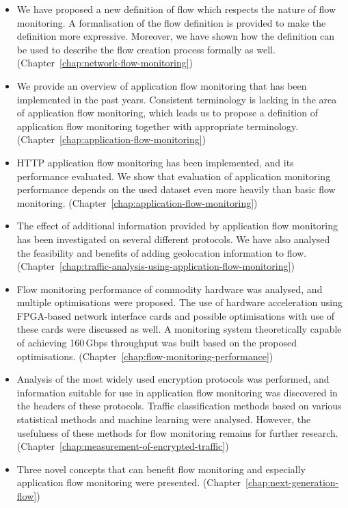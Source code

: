\begin{itemize}
    \item We have proposed a new definition of flow which respects the nature of flow monitoring. A formalisation of the flow definition is provided to make the definition more expressive. Moreover, we have shown how the definition can be used to describe the flow creation process formally as well. (Chapter~\ref{chap:network-flow-monitoring})
    \item We provide an overview of application flow monitoring that has been implemented in the past years. Consistent terminology is lacking in the area of application flow monitoring, which leads us to propose a definition of application flow monitoring together with appropriate terminology. (Chapter~\ref{chap:application-flow-monitoring})
    \item HTTP application flow monitoring has been implemented, and its performance evaluated. We show that evaluation of application monitoring performance depends on the used dataset even more heavily than basic flow monitoring. (Chapter~\ref{chap:application-flow-monitoring})
    \item The effect of additional information provided by application flow monitoring has been investigated on several different protocols. We have also analysed the feasibility and benefits of adding geolocation information to flow. (Chapter~\ref{chap:traffic-analysis-using-application-flow-monitoring})
    \item Flow monitoring performance of commodity hardware was analysed, and multiple optimisations were proposed. The use of hardware acceleration using FPGA-based network interface cards and possible optimisations with use of these cards were discussed as well. A monitoring system theoretically capable of achieving 160\,Gbps throughput was built based on the proposed optimisations. (Chapter~\ref{chap:flow-monitoring-performance})
    \item Analysis of the most widely used encryption protocols was performed, and information suitable for use in application flow monitoring was discovered in the headers of these protocols. Traffic classification methods based on various statistical methods and machine learning were analysed. However, the usefulness of these methods for flow monitoring remains for further research. (Chapter~\ref{chap:measurement-of-encrypted-traffic})
    \item Three novel concepts that can benefit flow monitoring and especially application flow monitoring were presented. (Chapter~\ref{chap:next-generation-flow})
\end{itemize}

